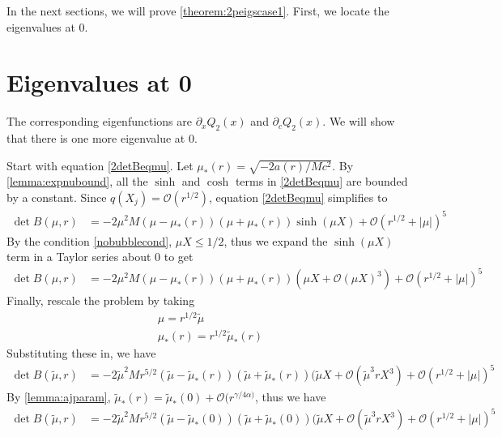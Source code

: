 \documentclass[thesis.tex]{subfiles}
\begin{document}
In the next sections, we will prove \cref{theorem:2peigscase1}. First, we locate the eigenvalues at 0.

\section{Eigenvalues at 0}

The corresponding eigenfunctions are $\partial_x Q_2(x)$ and $\partial_c Q_2(x)$. We will show that there is one more eigenvalue at 0.

Start with equation \cref{2detBeqmu}. Let $\mu_*(r) = \sqrt{-2a(r)/M c^2}$. By \cref{lemma:expnubound}, all the $\sinh$ and $\cosh$ terms in \cref{2detBeqmu} are bounded by a constant. Since $q(X_j) = \mathcal{O}(r^{1/2})$, equation \cref{2detBeqmu} simplifies to
\begin{equation}\label{2detBeqmu3}
\begin{aligned}
\det B(\mu, r) &= -2 \mu^2 M (\mu - \mu_*(r)) (\mu + \mu_*(r)) \sinh(\mu X) + \mathcal{O}( r^{1/2} + |\mu|)^5
\end{aligned}
\end{equation}
By the condition \cref{nobubblecond}, $\mu X \leq 1/2$, thus we expand the $\sinh(\mu X)$ term in a Taylor series about 0 to get
\begin{equation}\label{2detBeqmu4}
\begin{aligned}
\det B(\mu, r) &= -2 \mu^2 M (\mu - \mu_*(r)) (\mu + \mu_*(r))( \mu X + \mathcal{O}(\mu X)^3) + \mathcal{O}( r^{1/2} + |\mu|)^5
\end{aligned}
\end{equation}
Finally, rescale the problem by taking
\begin{align*}
\mu = r^{1/2}\tilde{\mu} \\
\mu_*(r) = r^{1/2}\tilde{\mu}_*(r)
\end{align*}
Substituting these in, we have
\begin{equation}\label{2detBeqmu5}
\begin{aligned}
\det B(\tilde{\mu}, r) &= -2 \tilde{\mu}^2 M r^{5/2} (\tilde{\mu} - \tilde{\mu}_*(r)) (\tilde{\mu} + \tilde{\mu}_*(r))( \tilde{\mu} X + \mathcal{O}(\tilde{\mu}^3 r X^3) + \mathcal{O}( r^{1/2} + |\mu|)^5
\end{aligned}
\end{equation}
By \cref{lemma:ajparam}, $\tilde{\mu}_*(r) = \tilde{\mu}_*(0) + \mathcal{O}(r^{\gamma/4 \alpha)}$, thus we have
\begin{equation}\label{2detBeqmu5}
\begin{aligned}
\det B(\tilde{\mu}, r) &= -2 \tilde{\mu}^2 M r^{5/2} (\tilde{\mu} - \tilde{\mu}_*(0)) (\tilde{\mu} + \tilde{\mu}_*(0))( \tilde{\mu} X + \mathcal{O}(\tilde{\mu}^3 r X^3) + \mathcal{O}( r^{1/2} + |\mu|)^5
\end{aligned}
\end{equation}
\end{document}
